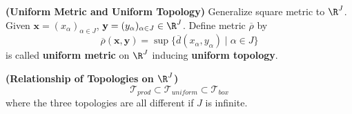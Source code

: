 \documentclass[10.5pt]{article}
\newcommand{\calT}{\mathcal{T}}
\newcommand{\bx}{\mathbf{x}}
\newcommand{\by}{\mathbf{y}}
\begin{document}
\begin{defn*}
    \textbf{(Uniform Metric and Uniform Topology)} Generalize square metric to $\R^{J}$. Given $\bx = (x_{\alpha})_{\alpha\in J}$, $\by = (y_{\alpha})_{\alpha\in J} \in \R^J$. Define metric $\overline{\rho}$ by
    \[
        \overline{\rho}(\bx, \by) = \sup \{ \overline{d}(x_{\alpha}, y_{\alpha}) \mid \alpha\in J\}
    \]
    is called \textbf{uniform metric} on $\R^J$ inducing \textbf{uniform topology}.
\end{defn*}

\begin{theorem*}
    \textbf{(Relationship of Topologies on $\R^J$)}
    \[
        \calT_{prod} \subset \calT_{uniform} \subset \calT_{box}    
    \]
    where the three topologies are all different if $J$ is infinite.
\end{theorem*}
\end{document}

